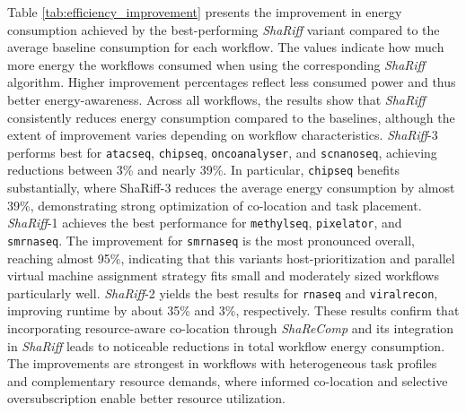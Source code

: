 \noindent
Table \ref{tab:efficiency_improvement} presents the improvement in energy consumption achieved by the best-performing \textit{ShaRiff} variant compared to the average baseline consumption for each workflow. The values indicate how much more energy the workflows consumed when using the corresponding \textit{ShaRiff} algorithm. Higher improvement percentages reflect less consumed power and thus better energy-awareness.
Across all workflows, the results show that \textit{ShaRiff} consistently reduces energy consumption compared to the baselines, although the extent of improvement varies depending on workflow characteristics. \textit{ShaRiff}-3 performs best for \texttt{atacseq}, \texttt{chipseq}, \texttt{oncoanalyser}, and \texttt{scnanoseq}, achieving reductions between 3\% and nearly 39\%. In particular, \texttt{chipseq} benefits substantially, where ShaRiff-3 reduces the average energy consumption by almost 39\%, demonstrating strong optimization of co-location and task placement.
\textit{ShaRiff}-1 achieves the best performance for \texttt{methylseq}, \texttt{pixelator}, and \texttt{smrnaseq}. The improvement for \texttt{smrnaseq} is the most pronounced overall, reaching almost 95\%, indicating that this variants host-prioritization and parallel virtual machine assignment strategy fits small and moderately sized workflows particularly well. \textit{ShaRiff}-2 yields the best results for \texttt{rnaseq} and \texttt{viralrecon}, improving runtime by about 35\% and 3\%, respectively.
These results confirm that incorporating resource-aware co-location through \textit{ShaReComp} and its integration in \textit{ShaRiff} leads to noticeable reductions in total workflow energy consumption. The improvements are strongest in workflows with heterogeneous task profiles and complementary resource demands, where informed co-location and selective oversubscription enable better resource utilization.

